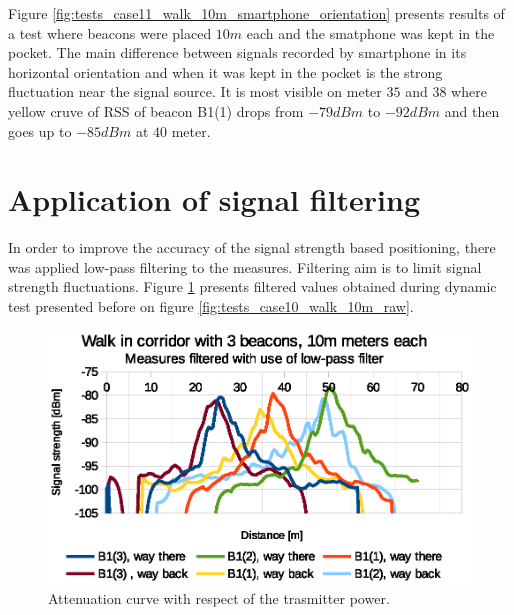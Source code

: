 \documentclass[../main.tex]{subfiles}
\begin{document}
Figure \ref{fig:tests_case11_walk_10m_smartphone_orientation} presents results of a test where beacons were placed $10m$ each and the smatphone was kept in the pocket. The main difference between signals recorded by smartphone in its horizontal orientation and when it was kept in the pocket is the strong fluctuation near the signal source. It is most visible on meter $35$ and $38$ where yellow cruve of RSS of beacon B1(1) drops from $-79dBm$ to $-92dBm$ and then goes up to $-85dBm$ at $40$ meter.


\FloatBarrier

\section{Application of signal filtering} %
\label{sec:application_of_signal_filtering}

In order to improve the accuracy of the signal strength based positioning, there was applied low-pass filtering to the measures. Filtering aim is to limit signal strength fluctuations. Figure \ref{fig:tests_case10_walk_10m_low_pass} presents filtered values obtained during dynamic test presented before on figure \ref{fig:tests_case10_walk_10m_raw}.


\begin{figure}[!htbp]
\includegraphics[width=\textwidth, keepaspectratio]{pictures/tests_case10_walk_10m_low_pass}
\centering
\caption{Attenuation curve with respect of the trasmitter power.}
\label{fig:tests_case10_walk_10m_low_pass}
\end{figure}
\end{document}
